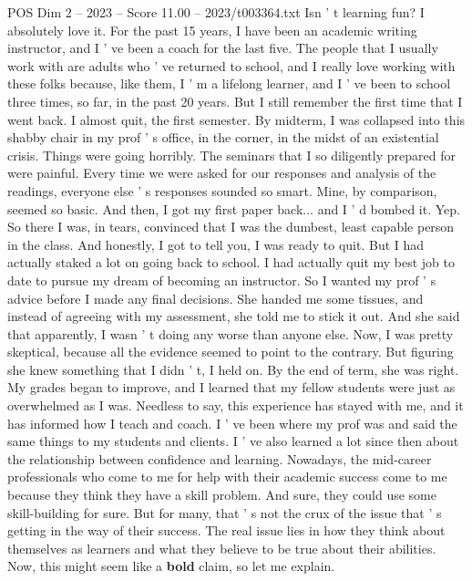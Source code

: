 \begin{textsample}{POS Dim 2 – 2023 – Score 11.00 – 2023/t003364.txt}  \label{ex:f2_pos_051}
Isn ' t learning fun?
I absolutely love it.
For the past 15 years, I have been an academic writing instructor, and I ' ve been a coach for the last five.
The people that I usually work with are adults who ' ve returned to school, and I really love working with these folks because, like them, I ' m a lifelong learner, and I ' ve been to school three times, so far, in the past 20 years.
But I still remember the first time that I went back.
I almost quit, the first semester.
By midterm, I was collapsed into this shabby chair in my prof ' s office, in the corner, in the midst of an existential crisis.
Things were going horribly.
The seminars that I so diligently prepared for were painful.
Every time we were asked for our responses and analysis of the readings, everyone else ' s responses sounded so smart.
Mine, by comparison, seemed so basic.
And then, I got my first paper back... and I ' d bombed it.
Yep.
So there I was, in tears, convinced that I was the dumbest, least capable person in the class.
And honestly, I got to tell you, I was ready to quit.
But I had actually staked a lot on going back to school.
I had actually quit my best job to date to pursue my dream of becoming an instructor.
So I wanted my prof ' s advice before I made any final decisions.
She handed me some tissues, and instead of agreeing with my assessment, she told me to stick it out.
And she said that apparently, I wasn ' t doing any worse than anyone else.
Now, I was pretty skeptical, because all the evidence seemed to point to the contrary.
But figuring she knew something that I didn ' t, I held on.
By the end of term, she was right.
My grades began to improve, and I learned that my fellow students were just as overwhelmed as I was.
Needless to say, this experience has stayed with me, and it has informed how I teach and coach.
I ' ve been where my prof was and said the same things to my students and clients.
I ' ve also learned a lot since then about the relationship between confidence and learning.
Nowadays, the mid-career professionals who come to me for help with their academic success come to me because they think they have a skill problem.
And sure, they could use some skill-building for sure.
But for many, that ' s not the crux of the issue that ' s getting in the way of their success.
The real issue lies in how they think about themselves as learners and what they believe to be true about their abilities.
Now, this might seem like a \textbf{bold} claim, so let me explain.

\end{textsample}

